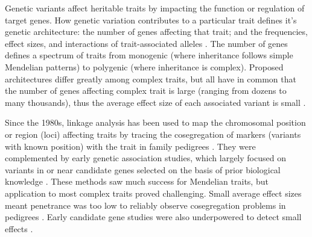 \begin{outline}
Genetic variants affect heritable traits by impacting the function or regulation of target genes.
How genetic variation contributes to a particular trait defines it's genetic architecture: 
the number of genes affecting that trait; and the frequencies, effect sizes, and interactions of trait-associated alleles \autocite{visscher2019Fisher1918Paper}.
The number of genes defines a spectrum of traits from monogenic (where inheritance follows simple Mendelian patterns) to polygenic (where inheritance is complex).
Proposed architectures differ greatly among complex traits, 
but all have in common that the number of genes affecting complex trait is large (ranging from dozens to many thousands),
thus the average effect size of each associated variant is small \autocite{hindorff2009PotentialEtiologicFunctional,gibson2011RareCommonVariants,boyle2017ExpandedViewComplex}.

Since the 1980s, linkage analysis has been used to map the chromosomal position or region (loci) affecting traits by tracing the cosegregation of markers (variants with known position) with the trait in family pedigrees \autocite{altshuler2008GeneticMappingHuman,ott2011FamilybasedDesignsGenomewide,visscher2012FiveYearsGWAS}.
They were complemented by early genetic association studies, which largely focused on variants in or near candidate genes selected on the basis of prior biological knowledge \autocite{hirschhorn2002ComprehensiveReviewGenetic}.
These methods saw much success for Mendelian traits, but application to most complex traits proved challenging.
Small average effect sizes meant penetrance was too low to reliably observe cosegregation problems in pedigrees \autocite{visscher2012FiveYearsGWAS}.
Early candidate gene studies were also underpowered to detect small effects \autocite{border2019NoSupportHistorical}.


\end{outline}
